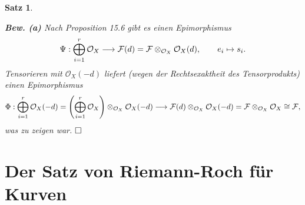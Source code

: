\documentclass[11pt]{book}
\newtheorem{theorem}{Satz}[section]
\theoremstyle{nonumberbreak}
\newenvironment{pr}[1][]{\ifthenelse{\equal{#1}{}}{\proof}{\proof[#1]}\rm}{\endproof}
\begin{document}
\begin{spacing}{1.4}
\begin{theorem}
\begin{pr}
 \begin{compactenum}
 \item[\textbf{Bew. (a)}] Nach Proposition 15.6 gibt es einen Epimorphismus 
 $$\Psi: \bigoplus_{i=1}^r \mathcal{O}_X \longrightarrow \mathcal{F}(d) = \mathcal{F} \otimes_{\mathcal{O}_X} \mathcal{O}_X(d), \qquad e_i \mapsto s_i.$$
 Tensorieren mit $\mathcal{O}_X(-d)$ liefert (wegen der Rechtsexaktheit des Tensorprodukts) einen Epimorphismus
 $$\Phi: \bigoplus_{i=1}^r \mathcal{O}_X(-d)= \left(\bigoplus_{i=1}^r \mathcal{O}_X\right) \otimes_{\mathcal{O}_X} \mathcal{O}_X(-d) \longrightarrow \mathcal{F}(d) \otimes_{\mathcal{O}_X} \mathcal{O}_X(-d) = \mathcal{F} \otimes_{\mathcal{O}_X} \mathcal{O}_X \cong \mathcal{F},$$
 was zu zeigen war.   $\hfill \Box$
 
 \end{compactenum}
 
 
 

 \end{pr}

\end{theorem}











\renewcommand*\thesection{§ \arabic{section}\quad}
\section{Der Satz von Riemann-Roch für Kurven} %
\renewcommand*\thesection{\arabic{section}}






\end{spacing}
\end{document}
